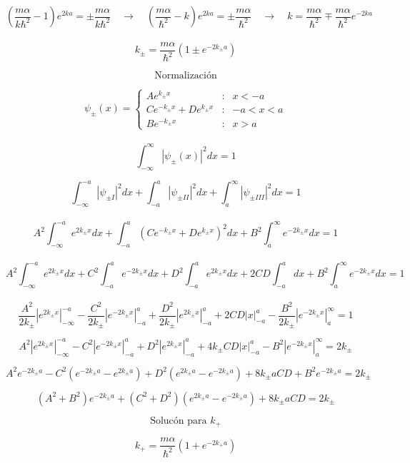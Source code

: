 \documentclass[10pt,a4papper]{article}
\begin{document}
\[\left(\frac{m\alpha}{k\hbar^2}-1\right)e^{2ka}=\pm\frac{m\alpha}{k\hbar^2}\quad\to\quad
\left(\frac{m\alpha}{\hbar^2}-k\right)e^{2ka}=\pm\frac{m\alpha}{\hbar^2}\quad\to\quad
k=\frac{m\alpha}{\hbar^2}\mp\frac{m\alpha}{\hbar^2}e^{-2ka}\]\\

\[\boxed{k_\pm=\frac{m\alpha}{\hbar^2}\left(1\pm e^{-2k_\pm a}\right)}\]

\newpage
\[\text{Normalización}\]

\[\psi_\pm(x)=
\left\{\begin{array}{ccc}
Ae^{k_\pm x} & : & x<-a \\
Ce^{-k_\pm x}+De^{k_\pm x} & : & -a<x<a\\
Be^{-k_\pm x} & : & x>a
\end{array}\]\\

\[\int_{-\infty}^\infty|\psi_\pm(x)|^2dx=1\]

\[\int_{-\infty}^{-a}|\psi_{\pm I}|^2dx+\int_{-a}^a|\psi_{\pm II}|^2dx+\int_a^\infty|\psi_{\pm III}|^2dx=1\]\\

\[A^2\int_{-\infty}^{-a}e^{2k_\pm x}dx+\int_{-a}^a\left(Ce^{-k_\pm x}+De^{k_\pm x}\right)^2dx+B^2\int_a^\infty e^{-2k_\pm x}dx=1\]\\

\[A^2\int_{-\infty}^{-a}e^{2k_\pm x}dx
+C^2\int_{-a}^ae^{-2k_\pm x}dx
+D^2\int_{-a}^ae^{2k_\pm x}dx
+2CD\int_{-a}^adx
+B^2\int_a^\infty e^{-2k_\pm x}dx=1\]\\

\[\frac{A^2}{2k_\pm}\left|e^{2k_\pm x}\right|_{-\infty}^{-a}
-\frac{C^2}{2k_\pm}\left|e^{-2k_\pm x}\right|_{-a}^a
+\frac{D^2}{2k_\pm}\left|e^{2k_\pm x}\right|_{-a}^a
+2CD|x|_{-a}^a
-\frac{B^2}{2k_\pm}\left|e^{-2k_\pm x}\right|_a^\infty=1\]

\[A^2\left|e^{2k_\pm x}\right|_{-\infty}^{-a}
-C^2\left|e^{-2k_\pm x}\right|_{-a}^a
+D^2\left|e^{2k_\pm x}\right|_{-a}^a
+4k_\pm CD|x|_{-a}^a
-B^2\left|e^{-2k_\pm x}\right|_a^\infty=2k_\pm\]

\[A^2e^{-2k_\pm a}
-C^2\left(e^{-2k_\pm a}-e^{2k_\pm a}\right)
+D^2\left(e^{2k_\pm a}-e^{-2k_\pm a}\right)
+8k_\pm aCD
+B^2e^{-2k_\pm a}=2k_\pm\]

\[\left(A^2+B^2\right)e^{-2k_\pm a}
+\left(C^2+D^2\right)\left(e^{2k_\pm a}-e^{-2k_\pm a}\right)
+8k_\pm aCD=2k_\pm\]

\newpage
\[\text{Solucón para }k_+\]

\[k_+=\frac{m\alpha}{\hbar^2}\left(1+e^{-2k_+ a}\right)\]
\end{document}

